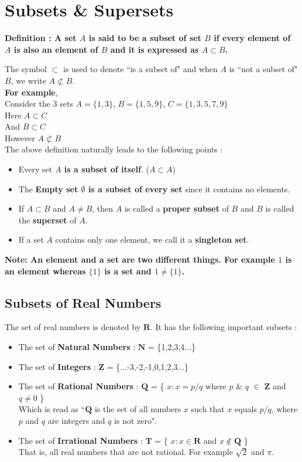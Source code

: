\documentclass[12pt, letterpaper]{article}
\begin{document}
\section{Subsets \& Supersets}
\begin{displayquote}
\textbf{Definition : A set $A$ is said to be a subset of set $B$ if every element of $A$ is also an element of $B$ and it is expressed as $A \subset B$.}
\end{displayquote}
The symbol $\subset$ is used to denote ``is a subset of" and when $A$ is ``not a subset of" $B$, we write $A \not \subset B$.\\
\textbf{For example},\\ 
Consider the 3 sets $A = \{1,3\}$, $B = \{1,5,9\}$, $C = \{1,3,5,7,9\}$\\
Here $A \subset C$\\
And $B \subset C$\\
However $A \not \subset B$\\
The above definition naturally leads to the following points : 
\begin{itemize}
    \item Every set \textbf{$A$ is a subset of itself}. ($A \subset A$)
    \item The \textbf{Empty set $\emptyset$ is a subset of every set} since it contains no elements.
    \item If $A \subset B$ and $A \neq B$, then $A$ is called a \textbf{proper subset} of $B$ and $B$ is called the \textbf{superset} of $A$.
    \item If a set $A$ contains only one element, we call it a \textbf{singleton set}.
\end{itemize}
\begin{displayquote}
\textbf{Note: An element and a set are two different things. For example $1$ is an element whereas $\{1\}$ is a set and $1 \neq \{1\}$.}
\end{displayquote}

\subsection{Subsets of Real Numbers}
The set of real numbers is denoted by $\mathbf{R}$. It has the following important subsets : 
\begin{itemize}
    \item The set of \textbf{Natural Numbers} : $\mathbf{N}$ = \{1,2,3,4...\}
    \item The set of \textbf{Integers} : $\mathbf{Z}$ = \{...-3,-2,-1,0,1,2,3...\}
    \item The set of \textbf{Rational Numbers} : $\mathbf{Q}$ = \{ $x : x = p/q$ where $p$ \& $q$ $\in$ $\mathbf{Z}$ and $q \neq 0$ \}\\
    Which is read as ``$\mathbf{Q}$ is the set of all numbers $x$ such that $x$ equals $p/q$, where $p$ and $q$ are integers and $q$ is not zero". 
    \item The set of \textbf{Irrational Numbers} : $\mathbf{T}$ = \{ $x : x \in \mathbf{R}$ and $x \notin \mathbf{Q}$ \}\\
    That is, all real numbers that are not rational. For example $\sqrt{2}$ and $\pi$.  
\end{itemize}
\end{document}

